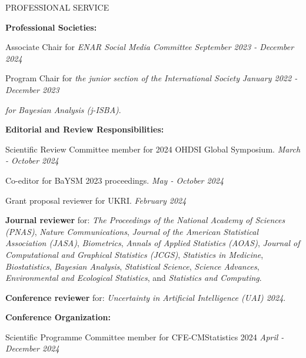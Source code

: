\documentclass{resume} %
\newcommand{\thisYear}[1]{
	#1
}
\begin{document}
\begin{rSection}{PROFESSIONAL SERVICE}
	
	\hspace*{-0.2in}\textbf{Professional Societies:}
	
	\thisYear{
	Associate Chair for \emph{ENAR Social Media Committee}  \hfill {\em September 2023 - December 2024}
}

		\smallskip
	
	Program Chair for \emph{the junior section of the International Society} \hfill {\em January 2022 - December 2023}
	
	\vspace{-0.1in}
	\emph{for Bayesian Analysis (j-ISBA)}.
	
\medskip 

 \hspace*{-0.2in}\textbf{Editorial and Review Responsibilities:}
 
 	Scientific Review Committee member for 2024 OHDSI Global Symposium. 	\hfill {\em March - October 2024}
 	
 	\smallskip 
	
		\thisYear{
 Co-editor for BaYSM 2023 proceedings.	\hfill {\em May - October 2024}
}

    \smallskip 
    
    	\thisYear{
    Grant proposal reviewer for UKRI.	\hfill {\em February 2024}
}
    
    \smallskip 
    
    \textbf{Journal reviewer} for: \emph{The Proceedings of the National Academy of Sciences (PNAS)}, \emph{Nature Communications}, \emph{Journal of the American Statistical Association (JASA)}, \emph{Biometrics}, \emph{Annals of Applied Statistics (AOAS)}, \emph{Journal of Computational and Graphical Statistics (JCGS)}, \emph{Statistics in Medicine}, \emph{Biostatistics}, \emph{Bayesian Analysis},  \emph{Statistical Science},  \emph{Science Advances}, \emph{Environmental and Ecological Statistics}, and \emph{Statistics and Computing}. 
    
 \smallskip 
%    
    \textbf{Conference reviewer} for: \emph{Uncertainty in Artificial Intelligence (UAI) 2024}. 
    
    \medskip 

 \hspace*{-0.2in}\textbf{Conference Organization:}
 
 	\thisYear{
 Scientific Programme Committee member for CFE-CMStatistics 2024 \hfill {\em April - December 2024}
}
 

\end{rSection}
\end{document}
